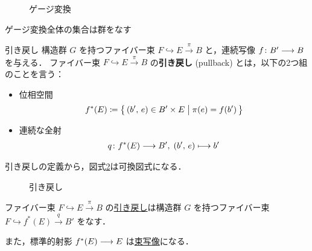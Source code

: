 \documentclass[algtopo_main]{subfiles}
\begin{document}
\begin{figure}[H]
    \centering
    \caption{ゲージ変換}
    \label{cmtd:gauge}
\end{figure}%

\begin{marker}
    ゲージ変換全体の集合は群をなす
\end{marker}

\begin{mydef}[label=def:FB-pullback]{引き戻し}
    構造群 $G$ を持つファイバー束 $F \hookrightarrow E \xrightarrow{\pi} B$ と，連続写像 $f \colon B' \longrightarrow B$ を与える．
    ファイバー束 $F \hookrightarrow E \xrightarrow{\pi} B$ の\textbf{引き戻し} (pullback) とは，以下の2つ組のことを言う：
    \begin{itemize}
        \item 位相空間
        \begin{align}
            f^*(E) \coloneqq \bigl\{\, (b',\, e) \in B' \times E \bigm| \pi(e) = f(b') \,\bigr\} 
        \end{align}
        \item 連続な全射
        \begin{align}
            q \colon f^* (E) \longrightarrow B',\; (b',\, e) \longmapsto b'
        \end{align}
    \end{itemize}
\end{mydef}

引き戻しの定義から，図式\ref{cmtd:FB-pullback}は可換図式になる．
\begin{figure}[H]
    \centering
    \caption{引き戻し}
    \label{cmtd:FB-pullback}
\end{figure}%


\begin{myprop}[label=prop:FB-pullback]{}
    ファイバー束 $F \hookrightarrow E \xrightarrow{\pi} B$ の\hyperref[def:FB-pullback]{引き戻し}は構造群 $G$ を持つファイバー束 $F \hookrightarrow f^*(E) \xrightarrow{q} B'$ をなす．

    また，標準的射影 $f^*(E) \longrightarrow E$ は\hyperref[def:bundle-morphism]{束写像}になる．
\end{myprop}
\end{document}
